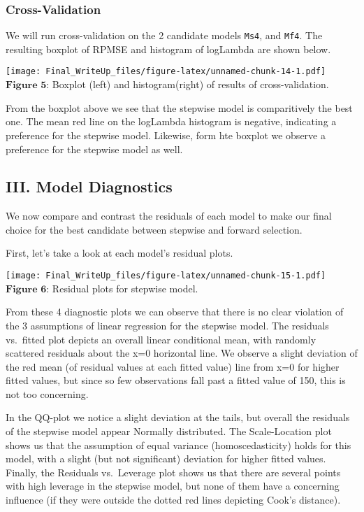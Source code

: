 \documentclass[]{article}
\begin{document}
\subsubsection{Cross-Validation}\label{cross-validation}

We will run cross-validation on the 2 candidate models \texttt{Ms4}, and
\texttt{Mf4}. The resulting boxplot of RPMSE and histogram of logLambda
are shown below.

\texttt{[image: Final\_WriteUp\_files/figure-latex/unnamed-chunk-14-1.pdf]}
\(\textbf{Figure 5}\): Boxplot (left) and histogram(right) of results of
cross-validation.

From the boxplot above we see that the stepwise model is comparitively
the best one. The mean red line on the logLambda histogram is negative,
indicating a preference for the stepwise model. Likewise, form hte
boxplot we observe a preference for the stepwise model as well.

\subsection{III. Model Diagnostics}\label{iii.-model-diagnostics}

We now compare and contrast the residuals of each model to make our
final choice for the best candidate between stepwise and forward
selection.

First, let's take a look at each model's residual plots.

\texttt{[image: Final\_WriteUp\_files/figure-latex/unnamed-chunk-15-1.pdf]}
\(\textbf{Figure 6}\): Residual plots for stepwise model.

From these 4 diagnostic plots we can observe that there is no clear
violation of the 3 assumptions of linear regression for the stepwise
model. The residuals vs.~fitted plot depicts an overall linear
conditional mean, with randomly scattered residuals about the x=0
horizontal line. We observe a slight deviation of the red mean (of
residual values at each fitted value) line from x=0 for higher fitted
values, but since so few observations fall past a fitted value of 150,
this is not too concerning.

In the QQ-plot we notice a slight deviation at the tails, but overall
the residuals of the stepwise model appear Normally distributed. The
Scale-Location plot shows us that the assumption of equal variance
(homoscedasticity) holds for this model, with a slight (but not
significant) deviation for higher fitted values. Finally, the Residuals
vs.~Leverage plot shows us that there are several points with high
leverage in the stepwise model, but none of them have a concerning
influence (if they were outside the dotted red lines depicting Cook's
distance).
\end{document}
